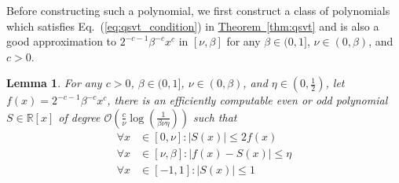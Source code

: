 \documentclass[journal]{IEEEtran}
\newtheorem{lemma}{Lemma}
\newcommand{\eq}[1]{Eq.~(\ref{eq:#1})}
\newcommand{\thm}[1]{\hyperref[thm:#1]{Theorem~\ref*{thm:#1}}}
\begin{document}
Before constructing such a polynomial, we first construct a class of polynomials which satisfies \eq{qsvt_condition} in \thm{qsvt} and is also a good approximation to $2^{-c-1}\beta^{-c}x^{c}$ in $[\nu,\beta]$ for any $\beta \in (0,1]$, $\nu \in (0,\beta)$, and $c > 0$.
\begin{lemma}
  \label{lem:scaled_poly_approx_with_small_value_at_zero}
  For any $c > 0$, $\beta \in (0,1]$, $\nu \in(0,\beta)$, and $\eta\in(0,\frac{1}{2})$, let $f(x) = 2^{-c-1}\beta^{-c}x^c$, there is an efficiently computable even or odd polynomial $S\in \mathbb{R}[x]$ of degree $\mathcal{O}\left(\frac{c}{\nu}\log(\frac{1}{\beta\nu\eta})\right)$ such that
  \begin{align}
      \forall x & \in [0,\nu]: |S(x)| \le 2f(x)         \nonumber \\
      \forall x & \in [\nu, \beta]: |f(x)-S(x)| \le \eta \nonumber \\
      \forall x & \in [-1,1]: |S(x)| \le 1               
  \end{align}
\end{lemma}
\end{document}
